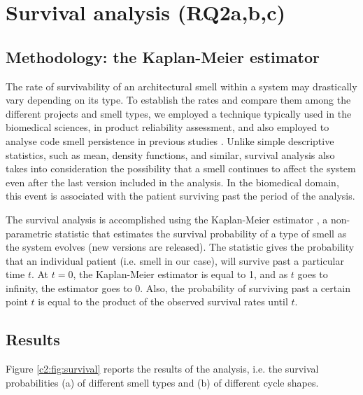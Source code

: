 \section{Survival analysis (RQ2a,b,c)}\label{c2:sec:rq2-results}
\subsection{Methodology: the Kaplan-Meier estimator}
The rate of survivability of an architectural smell within a system may drastically vary depending on its type. To establish the rates and compare them among the different projects and smell types, we employed a technique typically used in the biomedical sciences, in product reliability assessment, and also employed to analyse code smell persistence in previous studies \cite{Chatzigeorgiou2014}.
Unlike simple descriptive statistics, such as mean, density functions, and similar, survival analysis also takes into consideration the possibility that a smell continues to affect the system even after the last version included in the analysis.
In the biomedical domain, this event is associated with the patient surviving past the period of the analysis.

The survival analysis is accomplished using the Kaplan-Meier estimator \cite{Kaplan1958}, a non-parametric statistic that estimates the survival probability of a type of smell as the system evolves (new versions are released).
The statistic gives the probability that an individual patient (i.e. smell in our case), will survive past a particular time $t$.
At $t = 0$, the Kaplan-Meier estimator is equal to 1, and as $t$ goes to infinity, the estimator goes to 0. Also, the probability of surviving past a certain point $t$ is equal to the product of the observed survival rates until $t$.

\subsection{Results}
Figure \ref{c2:fig:survival} reports the results of the analysis, i.e. the survival probabilities (a) of different smell types and (b) of different cycle shapes.

